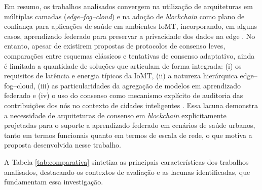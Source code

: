 \documentclass[12pt]{article}
\begin{document}
Em resumo, os trabalhos analisados convergem na utilização de arquiteturas em múltiplas camadas (\textit{edge–fog–cloud}) e na adoção de \textit{blockchain} como plano de confiança para aplicações de saúde em ambientes IoMT, incorporando, em alguns casos, aprendizado federado para preservar a privacidade dos dados na edge \cite{rajagopal2025,tripathy2024,ahmad2023,kamruzzaman2022,alam2022,ren2024,baucas2023}. No entanto, apesar de existirem propostas de protocolos de consenso leves, comparações entre esquemas clássicos e tentativas de consenso adaptativo, ainda é limitada a quantidade de soluções que articulam de forma integrada: (i) os requisitos de latência e energia típicos da IoMT, (ii) a natureza hierárquica edge–fog–cloud, (iii) as particularidades da agregação de modelos em aprendizado federado e (iv) o uso do consenso como mecanismo explícito de auditoria das contribuições dos nós no contexto de cidades inteligentes \cite{laouamri2025,cheikhrouhou2023,murthy2026,aljoboury2020,rajagopal2025,ren2024,baucas2023}. Essa lacuna demonstra a necessidade de arquiteturas de consenso em \textit{blockchain} explicitamente projetadas para o suporte a aprendizado federado em cenários de saúde urbanos, tanto em termos funcionais quanto em termos de escala de rede, o que motiva a proposta desenvolvida nesse trabalho.

A Tabela \ref{tab:comparativa} sintetiza as principais características dos trabalhos analisados, destacando os contextos de avaliação e as lacunas identificadas, que fundamentam essa investigação.
\end{document}
